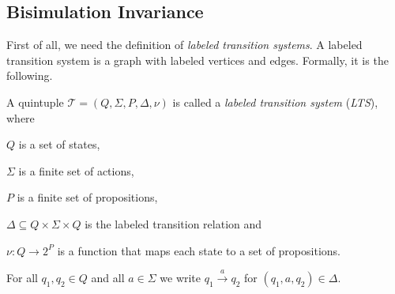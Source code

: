 
\subsection{Bisimulation Invariance}\label{subsec:bisimulationInvariance}

First of all, we need the definition of \textit{labeled transition systems}. A labeled transition system is a graph
with labeled vertices and edges. Formally, it is the following.

\begin{definition}
    \label{definition:lts}
    A quintuple $\mathcal{T} = (Q, \Sigma, P, \Delta, \nu)$ is called a \emph{labeled transition system} (\emph{LTS}),
    where
    \begin{compactitem}
        \item $Q$ is a set of states,
        \item $\Sigma$ is a finite set of actions,
        \item $P$ is a finite set of propositions,
        \item $\Delta \subseteq Q \times \Sigma \times Q$ is the labeled transition relation and
        \item $\nu: Q \rightarrow 2^P$ is a function that maps each state to a set of propositions.
    \end{compactitem}
\end{definition}

For all $q_1, q_2 \in Q$ and all $a \in \Sigma$ we write $q_1 \overset{a}{\rightarrow} q_2$ for $(q_1, a, q_2) \in
\Delta$.

